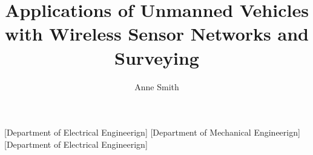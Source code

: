 \documentclass[12pt]{report}
\begin{document}
\chapternumberfont{\fontsize{16}{20}\selectfont}
\chaptertitlefont{\centering\fontsize{16}{20}\selectfont}
\sectionfont{\fontsize{14}{16}\selectfont}
\subsectionfont{\fontsize{12}{14}\selectfont}

\title{Applications of Unmanned Vehicles with Wireless Sensor Networks and Surveying} %
\author{Anne Smith}


[Department of Electrical Engineerign]
[Department of Mechanical Engineerign]
[Department of Electrical Engineerign]

\copyrighttrue
{}

\dissertationfalse

%
\makecoverpages

%
\begin{acknowledgements}

\end{acknowledgements}
\end{document}
